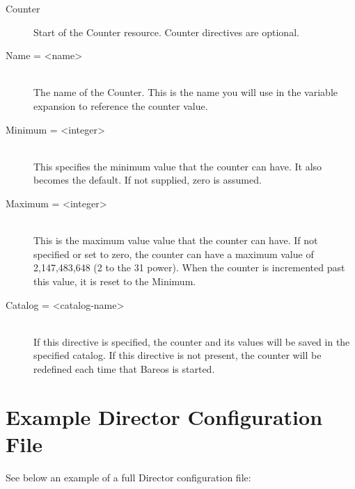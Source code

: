 \begin{description}

\item [Counter]
Start of the Counter resource.  Counter directives are optional.

\item [Name = {\textless}name{\textgreater}] \hfill \\
The name of the Counter.  This is the name you will use in the variable
expansion  to reference the counter value.

\item [Minimum = {\textless}integer{\textgreater}] \hfill \\
This specifies the minimum  value that the counter can have. It also becomes
the default.  If not supplied, zero is assumed.

\item [Maximum = {\textless}integer{\textgreater}] \hfill \\
This is the maximum value  value that the counter can have. If not specified
or set to  zero, the counter can have a maximum value of 2,147,483,648  (2 to
the 31 power). When the counter is incremented past  this value, it is reset
to the Minimum.


\item [Catalog = {\textless}catalog-name{\textgreater}] \hfill \\
If this directive is  specified, the counter and its values will be saved in
the specified catalog. If this directive is not present, the  counter will be
redefined each time that Bareos is started.
\end{description}

\section{Example Director Configuration File}
\label{SampleDirectorConfiguration}

See below an example of a full Director configuration file:

{
\footnotesize

}
